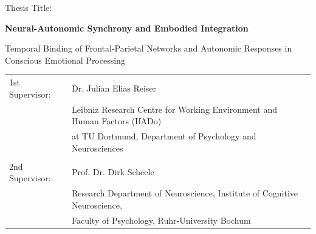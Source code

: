 \documentclass[12pt]{article} %
\begin{document}
\begin{titlepage}
\begin{center}
        \vspace{0.5cm}
        Thesis Title:

        \vspace{0.2cm}
        \textbf{Neural-Autonomic Synchrony and Embodied Integration}

        \vspace{0.2cm}
        Temporal Binding of Frontal-Parietal Networks and Autonomic Responses in Conscious Emotional Processing

        \vspace{0.5cm}
        \begin{minipage}{0.8\textwidth}
            \begin{tabular}{p{} p{}}
                1st Supervisor: & Dr. Julian Elias Reiser \\
                & Leibniz Research Centre for Working Environment and Human Factors (IfADo) \\
                & at TU Dortmund, Department of Psychology and Neurosciences\\
                \\
                2nd Supervisor: & Prof. Dr. Dirk Scheele \\
                & Research Department of Neuroscience, Institute of Cognitive Neuroscience, \\
                & Faculty of Psychology, Ruhr-University Bochum \\
            \end{tabular}
        \end{minipage}

        \vspace{\fill} %
    \end{center}
\end{titlepage}

\newpage %

\tableofcontents %

\newpage %

\listoffigures %

\newpage %

\printglossary[style=long3col, %
               type=\acronymtype, %
               title=List of Acronyms] %
\end{document}
